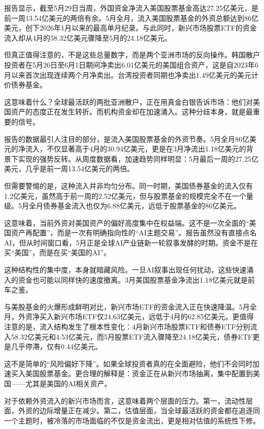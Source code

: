 \documentclass[11pt]{ctexart}
\begin{document}
报告显示，截至5月29日当周，外国资金净流入美国股票基金高达27.25亿美元，是前一周13.54亿美元的两倍有余。5月全月，流入美国股票基金的外资总额达到86亿美元，创下2026年1月以来的最高单月纪录。与此同时，新兴市场股票ETF的资金流入却从4月的58.32亿美元骤降至5月的24.18亿美元。

但真正值得注意的，不是这些总量数字，而是两个亚洲市场的反向操作。韩国散户投资者在5月26日至6月1日期间净卖出6.01亿美元的美国组合资产，这是自2023年6月以来首次出现连续两个月净卖出。台湾投资者同期也净卖出1.49亿美元的美元计价债券基金。

这意味着什么？全球最活跃的两批亚洲散户，正在用真金白银告诉市场：他们对美国资产的态度正在发生转折。而机构资金却在加速涌入。这种分歧本身，就是最重要的信号。

报告的数据最引人注目的部分，是流入美国股票基金的外资节奏。5月全月86亿美元的净流入，不仅显著高于4月的30.94亿美元，更是在3月净流出1.18亿美元的背景下实现的强势反转。从周度数据看，加速趋势同样明显：5月最后一周的27.25亿美元，几乎是前一周13.54亿美元的两倍。

但需要警惕的是，这种流入并非均匀分布。同一时期，美国债券基金的流入仅有1.2亿美元，虽然高于前一周的2.52亿美元，但与股票基金的规模完全不在一个量级。5月全月债券基金流入也仅为6.88亿美元，远低于股票基金的86亿美元。

这意味着，当前外资对美国资产的偏好高度集中在权益端。这不是一次全面的“美国资产再配置”，而是一次有明确指向性的“AI主题交易”。报告虽然没有直接点名AI，但从时间窗口看，5月正是全球AI产业链新一轮叙事发酵的时期。资金不是在买“美国”，而是在买“美国的AI”。

这种结构性的集中度，本身就暗藏风险。一旦AI叙事出现任何扰动，这些快速涌入的资金也可能以同样快的速度撤离。3月美国股票基金净流出1.18亿美元就是前车之鉴。

与美股基金的火爆形成鲜明对比，新兴市场ETF的资金流入正在快速降温。5月全月，外资净买入新兴市场ETF仅24.63亿美元，远低于4月的62.85亿美元。更值得注意的是，流入结构发生了根本性变化：4月新兴市场股票ETF和债券ETF分别流入58.32亿美元和4.53亿美元，而5月股票ETF流入骤降至24.18亿美元，债券ETF更是几乎停滞，仅有0.44亿美元。

这不是简单的“风险偏好下降”。如果全球投资者真的在全面避险，他们不会同时加速买入美国股票基金。更合理的解释是：资金正在从新兴市场抽离，集中配置到美国——尤其是美国的AI相关资产。

对于依赖外资流入的新兴市场而言，这意味着两个层面的压力。第一，流动性层面，外资的边际增量正在减少。第二，估值层面，当全球最活跃的资金都在追逐同一个主题时，被冷落的市场面临的不仅是资金流出，更是相对估值的系统性下修。
\end{document}
